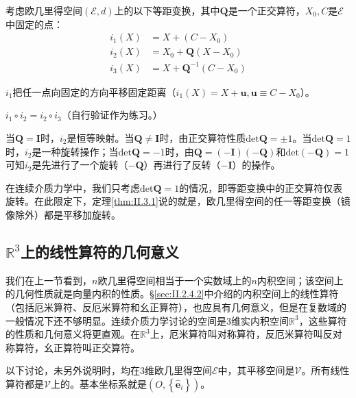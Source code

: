 \documentclass[main.tex]{subfiles}
\begin{document}
\begin{example}
    考虑欧几里得空间$\left(\mathcal{E},d\right)$上的以下等距变换，其中$\mathbf{Q}$是一个正交算符，$X_0,C$是$\mathcal{E}$中固定的点：
    \begin{align*}
        i_1\left(X\right) & =X+\left(C-X_0\right)                \\
        i_2\left(X\right) & =X_0+\mathbf{Q}\left(X-X_0\right)    \\
        i_3\left(X\right) & =X+\mathbf{Q}^{-1}\left(C-X_0\right)
    \end{align*}

    $i_1$把任一点向固定的方向平移固定距离（$i_1\left(X\right)=X+\mathbf{u},\mathbf{u}\equiv C-X_0$）。

    $i_1\circ i_2=i_2\circ i_3$（自行验证作为练习。）

    当$\mathbf{Q}=\mathbf{I}$时，$i_2$是恒等映射。当$\mathbf{Q}\neq\mathbf{I}$时，由正交算符性质$\mathrm{det}\mathbf{Q}=\pm 1$。当$\mathrm{det}\mathbf{Q}=1$时，$i_2$是一种旋转操作；当$\mathrm{det}\mathbf{Q}=-1$时，由$\mathbf{Q}=\left(-\mathbf{I}\right)\left(-\mathbf{Q}\right)$和$\mathrm{det}\left(-\mathbf{Q}\right)=1$可知$i_2$是先进行了一个旋转（$-\mathbf{Q}$）再进行了反转（$-\mathbf{I}$）的操作。
\end{example}

在连续介质力学中，我们只考虑$\mathrm{det}\mathbf{Q}=1$的情况，即等距变换中的正交算符仅表旋转。在此限定下，定理\ref{thm:II.3.1}说的就是，欧几里得空间的任一等距变换（镜像除外）都是平移加旋转。


\subsection{$\mathbb{R}^3$上的线性算符的几何意义}
我们在上一节看到，$n$欧几里得空间相当于一个实数域上的$n$内积空间；该空间上的几何性质就是向量内积的性质。\S\ref{sec:II.2.4.2}中介绍的内积空间上的线性算符（包括厄米算符、反厄米算符和幺正算符），也应具有几何意义，但是在复数域的一般情况下还不够明显。连续介质力学讨论的空间是3维实内积空间$\mathbb{R}^3$，这些算符的性质和几何意义将更直观。在$\mathbb{R}^3$上，厄米算符叫对称算符，反厄米算符叫反对称算符，幺正算符叫正交算符。

以下讨论，未另外说明时，均在3维欧几里得空间$\mathcal{E}$中，其平移空间是$\mathcal{V}$。所有线性算符都是$\mathcal{V}$上的。基本坐标系就是$\left(O,\left\{\mathbf{\hat{e}}_i\right\}\right)$。
\end{document}
